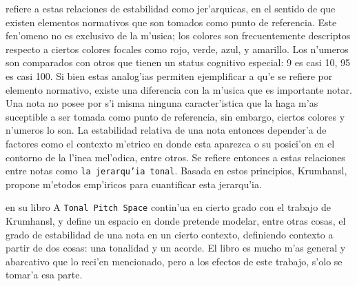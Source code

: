 \cite{Krumhansl90} refiere a estas relaciones de estabilidad como jer'arquicas, en el sentido de que existen elementos normativos que son tomados 
como punto de referencia. Este fen'omeno no es exclusivo de la m'usica; los colores son frecuentemente descriptos respecto a ciertos colores 
focales como rojo, verde, azul, y amarillo. Los n'umeros son comparados con otros que tienen un status cognitivo especial: 9 es casi 10, 95 es casi 100. 
Si bien estas analog'ias permiten ejemplificar a qu'e se refiere por elemento normativo, existe una diferencia con la m'usica que es importante notar. 
Una nota no posee por s'i misma ninguna caracter'istica que la haga m'as suceptible a ser tomada como punto de referencia, sin embargo, ciertos
colores y n'umeros lo son. La estabilidad relativa de una nota entonces 
depender'a de factores como el contexto m'etrico en donde esta aparezca o su posici'on en el contorno de la l'inea mel'odica, entre otros. 
Se refiere entonces a estas relaciones entre notas como \texttt{la jerarqu'ia tonal}. Basada en estos principios, Krumhansl, propone m'etodos 
emp'iricos para cuantificar esta jerarqu'ia.



\cite{Lerdahl2001} en su libro A \texttt{Tonal Pitch Space} contin'ua en cierto grado con el trabajo de Krumhansl, y define un espacio en donde pretende 
modelar, entre otras cosas, el grado de estabilidad de una nota en un cierto contexto, definiendo contexto a partir de dos cosas: una tonalidad y un acorde. 
El libro es mucho m'as general y abarcativo que lo reci'en mencionado, pero a los efectos de este trabajo, s'olo se tomar'a esa parte.

